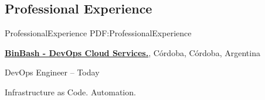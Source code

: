 \documentclass[letterpaper,MMMyyyy,nonstop]{simpleresumecv}
\begin{document}
\begin{body}

%
%


%
%


\section
{Professional \newline
	Experience}
{ProfessionalExperience}
{PDF:ProfessionalExperience}

\href{https://www.binbash.com.ar/}
{\textbf{BinBash - DevOps Cloud Services.}},
Córdoba, Córdoba, Argentina

\GapNoBreak
\BulletItem
DevOps Engineer
\hfill
{} --
Today
\begin{detail}
	\SubBulletItem
	Infrastructure as Code.
	\SubBulletItem
	Automation.
\end{detail}


\end{body}
\end{document}
